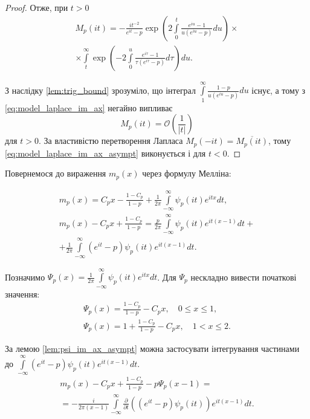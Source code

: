 \begin{lem}
\begin{proof}
Отже, при $t>0$
\begin{equation}
\label{eq:model_laplace_im_ax}
\begin{gathered}
M_{p}(it) = -\frac{i t^{-2}}{e^{it}-p} \exp \left(2 \int\limits_{0}^{t} \frac{e^{iu} -1}{u(e^{iu} - p)} du\right) \times \\
\times \int\limits_t^\infty \exp\left(-2 \int\limits_{0}^{u} \frac{e^{i\tau} -1}{\tau(e^{i\tau} - p)} d\tau\right) du.
\end{gathered}
\end{equation}

З наслідку \eqref{lem:trig_bound} зрозуміло, що інтеграл $\int\limits_{1}^{\infty} \frac{1-p}{u(e^{iu} - p)} du$ існує, а тому з \eqref{eq:model_laplace_im_ax} негайно випливає
\begin{equation}
\label{eq:model_laplace_im_ax_asympt}
M_{p}(it) = \mathcal{O}\left(\frac{1}{|t|}\right)
\end{equation}
для $t > 0$. За властивістю перетворення Лапласа $M_{p}(-it) = \overline{M_{p}(it)}$, тому \eqref{eq:model_laplace_im_ax_asympt} виконується і для $t < 0$.
\end{proof}
\end{lem}

Повернемося до вираження $m_{p}(x)$ через формулу Мелліна:

\begin{gather*}
m_{p}(x) = C_{p} x - \frac{1 - C_p}{1-p} + \frac{1}{2\pi} \int\limits_{-\infty}^{\infty} \psi_{p}(it) e^{itx} dt, \\
m_{p}(x) - C_{p} x + \frac{1 - C_p}{1-p} = \frac{p}{2\pi} \int\limits_{-\infty}^{\infty} \psi_{p}(it) e^{it(x-1)} dt + \\
+ \frac{1}{2\pi} \int\limits_{-\infty}^{\infty} (e^{it} - p) \psi_{p}(it) e^{it(x-1)} dt.
\end{gather*}

Позначимо $\Psi_{p}(x) = \frac{1}{2\pi} \int\limits_{-\infty}^{\infty} \psi_{p}(it) e^{itx} dt$. Для $\Psi_{p}$ нескладно вивести початкові значення:
\begin{equation}
\label{eq:psi_x_initial_values}
\begin{gathered}
\Psi_{p}(x) = \frac{1 - C_p}{1-p} - C_{p} x, \quad 0 \leq x \leq 1, \\
\Psi_{p}(x) = 1 + \frac{1 - C_p}{1-p} - C_{p} x, \quad 1 < x \leq 2.
\end{gathered}
\end{equation}

За лемою \eqref{lem:psi_im_ax_asympt} можна застосувати інтегрування частинами до $\int\limits_{-\infty}^{\infty} (e^{it} - p) \psi_{p}(it) e^{it(x-1)} dt$.
\begin{gather*}
m_{p}(x) - C_{p} x + \frac{1 - C_p}{1-p} - p\Psi_{p}(x-1) = \\
= -\frac{i}{2\pi (x-1)} \int\limits_{-\infty}^{\infty} \frac{\partial}{\partial t}((e^{it} - p) \psi_{p}(it)) e^{it(x-1)} dt.
\end{gather*}

